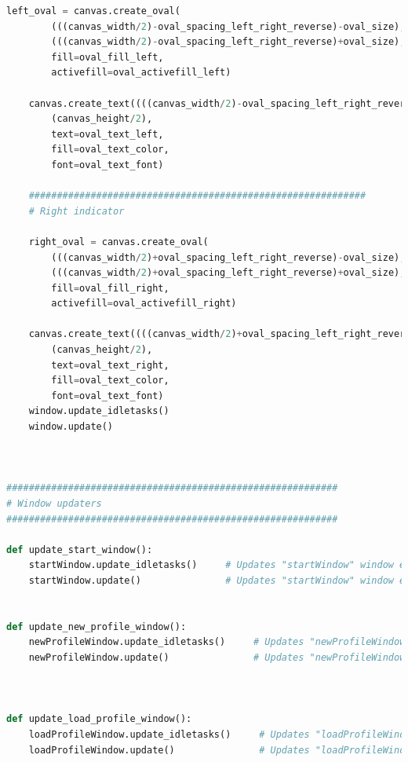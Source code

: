 \documentclass[conference]{IEEEtran}
\begin{document}
\begin{lstlisting}[language=Python, caption=GUI CODE, label=gui_code]
    left_oval = canvas.create_oval(
        (((canvas_width/2)-oval_spacing_left_right_reverse)-oval_size),((canvas_height/2)-(oval_size)*(2/3)),
        (((canvas_width/2)-oval_spacing_left_right_reverse)+oval_size),((canvas_height/2)+(oval_size)*(2/3)),
        fill=oval_fill_left,
        activefill=oval_activefill_left)

    canvas.create_text((((canvas_width/2)-oval_spacing_left_right_reverse)),        # Left indicator text creation
        (canvas_height/2),
        text=oval_text_left, 
        fill=oval_text_color,
        font=oval_text_font)

    ############################################################
    # Right indicator

    right_oval = canvas.create_oval(
        (((canvas_width/2)+oval_spacing_left_right_reverse)-oval_size),((canvas_height/2)-(oval_size)*(2/3)),
        (((canvas_width/2)+oval_spacing_left_right_reverse)+oval_size),((canvas_height/2)+(oval_size)*(2/3)),
        fill=oval_fill_right,
        activefill=oval_activefill_right)

    canvas.create_text((((canvas_width/2)+oval_spacing_left_right_reverse)),        # Right indicator text creation
        (canvas_height/2),
        text=oval_text_right, 
        fill=oval_text_color,
        font=oval_text_font)
    window.update_idletasks()
    window.update()



###########################################################
# Window updaters
###########################################################

def update_start_window():
    startWindow.update_idletasks()     # Updates "startWindow" window even if not called upon to prevent errors 
    startWindow.update()               # Updates "startWindow" window even if not called upon to prevent errors 
    

def update_new_profile_window():
    newProfileWindow.update_idletasks()     # Updates "newProfileWindow" window even if not called upon to prevent errors 
    newProfileWindow.update()               # Updates "newProfileWindow" window even if not called upon to prevent errors 



def update_load_profile_window():
    loadProfileWindow.update_idletasks()     # Updates "loadProfileWindow" window even if not called upon to prevent errors 
    loadProfileWindow.update()               # Updates "loadProfileWindow" window even if not called upon to prevent errors 




\end{lstlisting}
\end{document}
